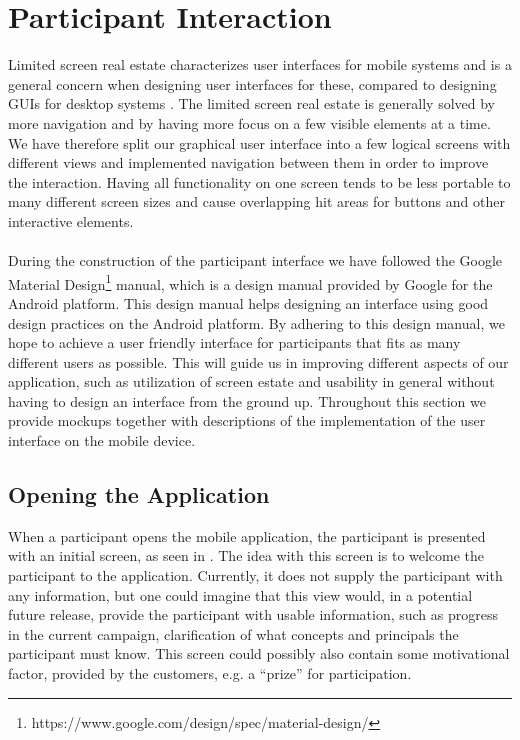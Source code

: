 
\section{Participant Interaction}
\label{sec:participant_interaction}
Limited screen real estate characterizes user interfaces for mobile systems and is a general concern when designing user interfaces for these, compared to designing GUIs for desktop systems \parencite[cha. 21]{mobile_computing_constraints}. The limited screen real estate is generally solved by more navigation and by having more focus on a few visible elements at a time. We have therefore split our graphical user interface into a few logical screens with different views and implemented navigation between them in order to improve the interaction. Having all functionality on one screen tends to be less portable to many different screen sizes and cause overlapping hit areas for buttons and other interactive elements.
\\\\
During the construction of the participant interface we have followed the Google Material Design\footnote{https://www.google.com/design/spec/material-design/} manual, which is a design manual provided by Google for the Android platform. This design manual helps designing an interface using good design practices on the Android platform. By adhering to this design manual, we hope to achieve a user friendly interface for participants that fits as many different users as possible. This will guide us in improving different aspects of our application, such as utilization of screen estate and usability in general without having to design an interface from the ground up. Throughout this section we provide mockups together with descriptions of the implementation of the user interface on the mobile device.

\subsection{Opening the Application}
\label{sub:opening_the_application}
When a participant opens the mobile application, the participant is presented with an initial screen, as seen in . The idea with this screen is to welcome the participant to the application. Currently, it does not supply the participant with any information, but one could imagine that this view would, in a potential future release, provide the participant with usable information, such as progress in the current campaign, clarification of what concepts and principals the participant must know. This screen could possibly also contain some motivational factor, provided by the customers, e.g. a ``prize'' for participation.

